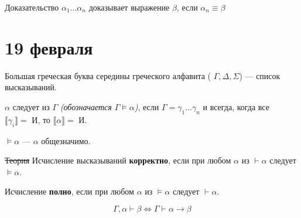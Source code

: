 \begin{definition}
    Доказательство \(\alpha_1\dots \alpha_n\) доказывает выражение \(\beta\), если \(\alpha_n \equiv \beta\)
\end{definition}

\chapter{19 февраля}

\begin{obozn}
    Большая греческая буква середины греческого алфавита ( \(\Gamma, \Delta, \Sigma\)) --- список высказываний.
\end{obozn}

\begin{definition}[следование]
    \(\alpha\) следует из \(\Gamma\) \textit{(обозначается \(\Gamma\models\alpha\))}, если \(\Gamma = \gamma_1 \dots \gamma_n\) и всегда, когда все \(\llbracket \gamma_i \rrbracket = \text{ И}\), то \(\llbracket \alpha \rrbracket = \text{ И}\).
\end{definition}

\begin{example}
    \(\models \alpha\) --- \(\alpha\) общезначимо.
\end{example}

\begin{definition}
    \sout{Теория} Исчисление высказываний \textbf{корректно}, если при любом \(\alpha\) из \(\vdash \alpha\) следует \(\models \alpha\).
\end{definition}

\begin{definition}
    Исчисление \textbf{полно}, если при любом \(\alpha\) из \(\models \alpha\) следует \(\vdash \alpha\).
\end{definition}

\begin{theorem}[о дедукции]
    \[\Gamma, \alpha \vdash \beta \Leftrightarrow \Gamma \vdash \alpha \to \beta\]
\end{theorem}

